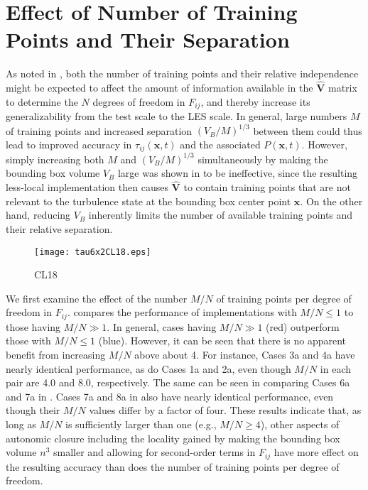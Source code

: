 \section{Effect of Number of Training Points and Their Separation}
\label{sec:IVE}

As noted in , both the number of training points and their relative independence might be expected to affect the amount of information available in the $\widehat{\mathbf{V}}$  matrix to determine the $N$ degrees of freedom in $F_{ij}$, and thereby increase its generalizability from the test scale to the LES scale. In general, large numbers $M$ of training points and increased separation $(V_B/M)^{1/3}$  between them could thus lead to improved accuracy in $\tau_{ij}(\mathbf{x},t)$  and the associated  $P(\mathbf{x},t)$. However, simply increasing both $M$ and $(V_B/M)^{1/3}$  simultaneously by making the bounding box volume  $V_B$ large was shown in  to be ineffective, since the resulting less-local implementation then causes $\widehat{\mathbf{V}}$ to contain training points that are not relevant to the turbulence state at the bounding box center point $\mathbf{x}$. On the other hand, reducing  $V_B$ inherently limits the number of available training points and their relative separation. 


%
\begin{figure}
	\begin{center}
	\texttt{[image: tau6x2CL18.eps]}
	\caption{CL18}
	\label{F:CL18}
	\end{center}
\end{figure}
%
%

We first examine the effect of the number  $M/N$ of training points per degree of freedom 
in $F_{ij}$.   compares the performance of implementations with $M/N \leq 1$  to those having $M/N \gg 1$. In general, cases having  $M/N \gg 1$ (red) outperform those with  $M/N \leq 1$ (blue). However, it can be seen that there is no apparent benefit from increasing $M/N$ above about 4. For instance, Cases 3a and 4a have nearly identical performance, as do Cases 1a and 2a, even though  $M/N$ in each pair are 4.0 and 8.0, respectively. The same can be seen in comparing Cases 6a and 7a in . Cases 7a and 8a in  also have nearly identical performance, even though their $M/N$ values differ by a factor of four. These results indicate that, as long as $M/N$  is sufficiently larger than one (e.g., $M/N \geq 4$), other aspects of autonomic closure including the locality gained by making the bounding box volume  $n^3$ smaller and allowing for second-order terms in $F_{ij}$  have more effect on the resulting accuracy than does the number of training points per degree of freedom.

